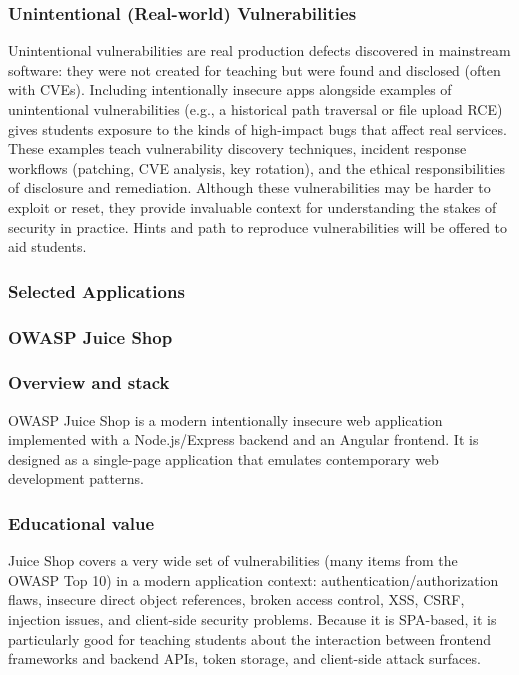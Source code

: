 \documentclass[12pt,titlepage]{article}
\begin{document}
\subsubsection*{Unintentional (Real-world) Vulnerabilities}
Unintentional vulnerabilities are real production defects discovered in mainstream software: they were not created for teaching but were found and disclosed (often with CVEs). Including intentionally insecure apps alongside examples of unintentional vulnerabilities (e.g., a historical path traversal or file upload RCE) gives students exposure to the kinds of high-impact bugs that affect real services. These examples teach vulnerability discovery techniques, incident response workflows (patching, CVE analysis, key rotation), and the ethical responsibilities of disclosure and remediation. Although these vulnerabilities may be harder to exploit or reset, they provide invaluable context for understanding the stakes of security in practice. Hints and path to reproduce vulnerabilities will be offered to aid students.

\subsubsection{Selected Applications}

\subsubsection{OWASP Juice Shop}

\subsubsection*{Overview and stack}
OWASP Juice Shop is a modern intentionally insecure web application implemented with a Node.js/Express backend and an Angular frontend. It is designed as a single-page application that emulates contemporary web development patterns.

\subsubsection*{Educational value}	
Juice Shop covers a very wide set of vulnerabilities (many items from the OWASP Top 10) in a modern application context: authentication/authorization flaws, insecure direct object references, broken access control, XSS, CSRF, injection issues, and client-side security problems. Because it is SPA-based, it is particularly good for teaching students about the interaction between frontend frameworks and backend APIs, token storage, and client-side attack surfaces.
\end{document}

